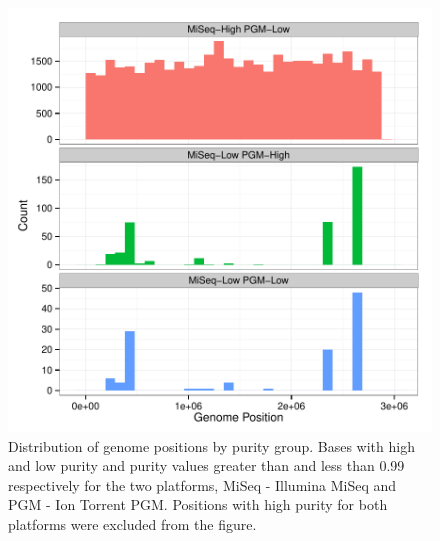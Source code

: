\documentclass[smallextended]{svjour3}\usepackage[]{graphicx}\usepackage[]{color}
\makeatletter
\def\maxwidth{ %
  \ifdim\Gin@nat@width>\linewidth
    \linewidth
  \else
    \Gin@nat@width
  \fi
}
\newenvironment{knitrout}{}{} %
\makeatother
\begin{document}
\begin{knitrout}
\color{fgcolor}\begin{figure}

{\centering \includegraphics[width=\maxwidth]{figure/purityPositionFig-1} 

}

\caption[Distribution of genome positions by purity group]{Distribution of genome positions by purity group. Bases with high and low purity and purity values greater than and less than 0.99 respectively for the two platforms, MiSeq - Illumina MiSeq and PGM - Ion Torrent PGM. Positions with high purity for both platforms were excluded from the figure.}\label{fig:purityPositionFig}
\end{figure}


\end{knitrout}
\end{document}
